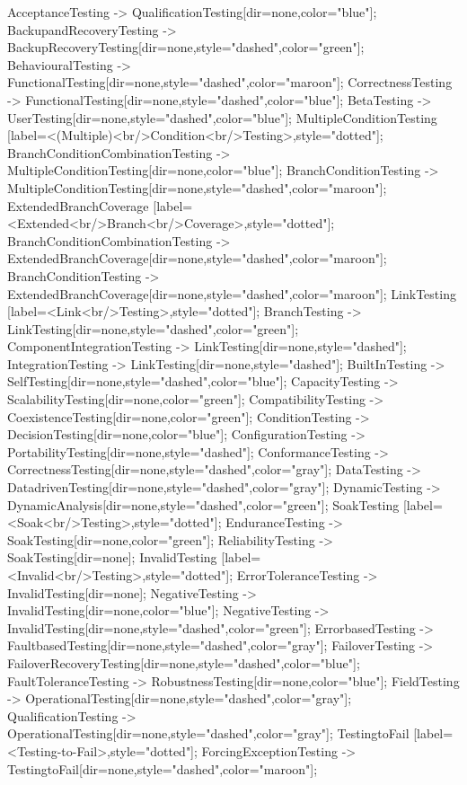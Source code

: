 \documentclass{article}
\begin{document}
{AcceptanceTesting -> QualificationTesting[dir=none,color="blue"];
BackupandRecoveryTesting -> BackupRecoveryTesting[dir=none,style="dashed",color="green"];
BehaviouralTesting -> FunctionalTesting[dir=none,style="dashed",color="maroon"];
CorrectnessTesting -> FunctionalTesting[dir=none,style="dashed",color="blue"];
BetaTesting -> UserTesting[dir=none,style="dashed",color="blue"];
MultipleConditionTesting [label=<(Multiple)<br/>Condition<br/>Testing>,style="dotted"];
BranchConditionCombinationTesting -> MultipleConditionTesting[dir=none,color="blue"];
BranchConditionTesting -> MultipleConditionTesting[dir=none,style="dashed",color="maroon"];
ExtendedBranchCoverage [label=<Extended<br/>Branch<br/>Coverage>,style="dotted"];
BranchConditionCombinationTesting -> ExtendedBranchCoverage[dir=none,style="dashed",color="maroon"];
BranchConditionTesting -> ExtendedBranchCoverage[dir=none,style="dashed",color="maroon"];
LinkTesting [label=<Link<br/>Testing>,style="dotted"];
BranchTesting -> LinkTesting[dir=none,style="dashed",color="green"];
ComponentIntegrationTesting -> LinkTesting[dir=none,style="dashed"];
IntegrationTesting -> LinkTesting[dir=none,style="dashed"];
BuiltInTesting -> SelfTesting[dir=none,style="dashed",color="blue"];
CapacityTesting -> ScalabilityTesting[dir=none,color="green"];
CompatibilityTesting -> CoexistenceTesting[dir=none,color="green"];
ConditionTesting -> DecisionTesting[dir=none,color="blue"];
ConfigurationTesting -> PortabilityTesting[dir=none,style="dashed"];
ConformanceTesting -> CorrectnessTesting[dir=none,style="dashed",color="gray"];
DataTesting -> DatadrivenTesting[dir=none,style="dashed",color="gray"];
DynamicTesting -> DynamicAnalysis[dir=none,style="dashed",color="green"];
SoakTesting [label=<Soak<br/>Testing>,style="dotted"];
EnduranceTesting -> SoakTesting[dir=none,color="green"];
ReliabilityTesting -> SoakTesting[dir=none];
InvalidTesting [label=<Invalid<br/>Testing>,style="dotted"];
ErrorToleranceTesting -> InvalidTesting[dir=none];
NegativeTesting -> InvalidTesting[dir=none,color="blue"];
NegativeTesting -> InvalidTesting[dir=none,style="dashed",color="green"];
ErrorbasedTesting -> FaultbasedTesting[dir=none,style="dashed",color="gray"];
FailoverTesting -> FailoverRecoveryTesting[dir=none,style="dashed",color="blue"];
FaultToleranceTesting -> RobustnessTesting[dir=none,color="blue"];
FieldTesting -> OperationalTesting[dir=none,style="dashed",color="gray"];
QualificationTesting -> OperationalTesting[dir=none,style="dashed",color="gray"];
TestingtoFail [label=<Testing-to-Fail>,style="dotted"];
ForcingExceptionTesting -> TestingtoFail[dir=none,style="dashed",color="maroon"];
}
\end{document}
